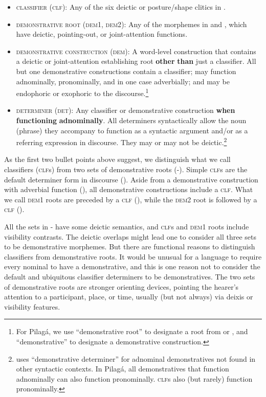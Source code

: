 \documentclass[output=paper,colorlinks,citecolor=brown]{langscibook}
\begin{document}
\begin{itemize}
\item \textsc{classifier} (\textsc{clf}): Any of the six deictic or posture/shape clitics in .
\item \textsc{demonstrative} \textsc{root} (\textsc{dem1}, \textsc{dem2}): Any of the morphemes in  and , which have deictic, pointing-out, or joint-attention functions.
\item \textsc{demonstrative} \textsc{construction} \textsc{(dem)}: A word-level construction that contains a deictic or joint-attention establishing root \textbf{other} \textbf{than} just a classifier. All but one demonstrative constructions contain a classifier; may function adnominally, pronominally, and in one case adverbially; and may be endophoric or exophoric to the discourse.\footnote{For Pilagá, we use “demonstrative root” to designate a root from  or , and “demonstrative” to designate a demonstrative construction.}
\item \textsc{determiner} \textsc{(det)}: Any classifier or demonstrative construction \textbf{when} \textbf{functioning} \textbf{adnominally}. All determiners syntactically allow the noun (phrase) they accompany to function as a syntactic argument and/or as a referring expression in discourse. They may or may not be deictic.\footnote{\citet[57]{Diessel1999Book} uses “demonstrative determiner” for adnominal demonstratives not found in other syntactic contexts. In Pilagá, all demonstratives that function adnominally can also function pronominally. \textsc{clf}s also (but rarely) function pronominally.}
\end{itemize}

As the first two bullet points above suggest, we distinguish what we call classifiers (\textsc{clf}s) from two sets of demonstrative roots (-). Simple \textsc{clf}s are the default determiner form in discourse (). Aside from a demonstrative construction with adverbial function (), all demonstrative constructions include a \textsc{clf}. What we call \textsc{dem1} roots are preceded by a \textsc{clf} (), while the \textsc{dem2} root is followed by a \textsc{clf} ().

All the sets in - have some deictic semantics, and \textsc{clf}s and \textsc{dem1} roots include visibility contrasts. The deictic overlaps might lead one to consider all three sets to be demonstrative morphemes. But there are functional reasons to distinguish classifiers from demonstrative roots. It would be unusual for a language to require every nominal to have a demonstrative, and this is one reason not to consider the default and ubiquitous classifier determiners to be demonstratives. The two sets of demonstrative roots are stronger orienting devices, pointing the hearer’s attention to a participant, place, or time, usually (but not always) via deixis or visibility features.
\end{document}
